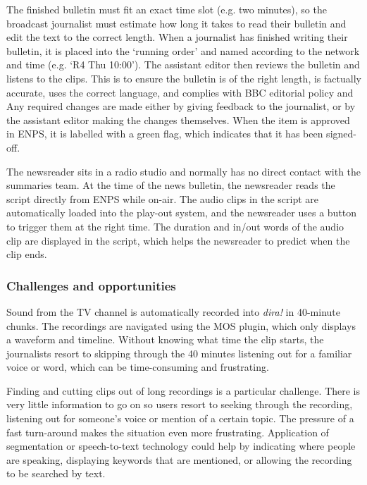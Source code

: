 The finished bulletin must fit an exact time slot (e.g. two minutes), so the broadcast journalist must estimate how
long it takes to read their bulletin and edit the text to the correct length.  When a journalist has finished writing
their bulletin, it is placed into the `running order' and named according to the network and time (e.g. `R4 Thu
10:00').  The assistant editor then reviews the bulletin and listens to the clips. This is to ensure the bulletin is of
the right length, is factually accurate, uses the correct language, and complies with BBC editorial policy and Any
required changes are made either by giving feedback to the journalist, or by the assistant editor making the changes
themselves.  When the item is approved in ENPS, it is labelled with a green flag, which indicates that it has been
signed-off.

The newsreader sits in a radio studio and normally has no direct contact with the summaries team.  At the time of the
news bulletin, the newsreader reads the script directly from ENPS while on-air. The audio clips in the script are
automatically loaded into the play-out system, and the newsreader uses a button to trigger them at the right time.  The
duration and in/out words of the audio clip are displayed in the script, which helps the newsreader to predict when the
clip ends.

\subsubsection{Challenges and opportunities}

Sound from the TV channel is automatically recorded into \textit{dira!} in 40-minute chunks.
The recordings are navigated using the MOS plugin, which only displays a waveform and timeline.
Without knowing what time the clip starts, the journalists resort to skipping through the 40 minutes listening out for
a familiar voice or word, which can be time-consuming and frustrating.

Finding and cutting clips out of long recordings is a particular challenge.  There is very little information to go on
so users resort to seeking through the recording, listening out for someone's voice or mention of a certain topic.  The
pressure of a fast turn-around makes the situation even more frustrating.  Application of segmentation or
speech-to-text technology could help by indicating where people are speaking, displaying keywords that are mentioned,
or allowing the recording to be searched by text.

